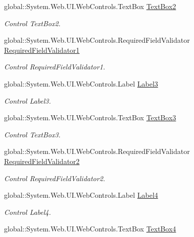 \begin{DoxyCompactItemize}
global\+::\+System.\+Web.\+U\+I.\+Web\+Controls.\+Text\+Box \mbox{\hyperlink{class_inicio_1_1_registro_a24be4248d4791f6b323568f814f5e5c2}{Text\+Box2}}
\begin{DoxyCompactList}\small\item\em Control Text\+Box2. \end{DoxyCompactList}\item 
global\+::\+System.\+Web.\+U\+I.\+Web\+Controls.\+Required\+Field\+Validator \mbox{\hyperlink{class_inicio_1_1_registro_af596d0fdac782957e6f85a4e5d8f3ee3}{Required\+Field\+Validator1}}
\begin{DoxyCompactList}\small\item\em Control Required\+Field\+Validator1. \end{DoxyCompactList}\item 
global\+::\+System.\+Web.\+U\+I.\+Web\+Controls.\+Label \mbox{\hyperlink{class_inicio_1_1_registro_ae363d31acf3834211c8e17996e39782f}{Label3}}
\begin{DoxyCompactList}\small\item\em Control Label3. \end{DoxyCompactList}\item 
global\+::\+System.\+Web.\+U\+I.\+Web\+Controls.\+Text\+Box \mbox{\hyperlink{class_inicio_1_1_registro_adc45c7cdfd1ee0e80f517f1bb9e827ff}{Text\+Box3}}
\begin{DoxyCompactList}\small\item\em Control Text\+Box3. \end{DoxyCompactList}\item 
global\+::\+System.\+Web.\+U\+I.\+Web\+Controls.\+Required\+Field\+Validator \mbox{\hyperlink{class_inicio_1_1_registro_a315fe7dd04ad883d4acd03f25fb7c1e9}{Required\+Field\+Validator2}}
\begin{DoxyCompactList}\small\item\em Control Required\+Field\+Validator2. \end{DoxyCompactList}\item 
global\+::\+System.\+Web.\+U\+I.\+Web\+Controls.\+Label \mbox{\hyperlink{class_inicio_1_1_registro_a0cb8176c99e6ad87d5f77896e1aaf5d1}{Label4}}
\begin{DoxyCompactList}\small\item\em Control Label4. \end{DoxyCompactList}\item 
global\+::\+System.\+Web.\+U\+I.\+Web\+Controls.\+Text\+Box \mbox{\hyperlink{class_inicio_1_1_registro_a835108d17c8690d089f9ee129b2ff7f3}{Text\+Box4}}

\end{DoxyCompactItemize}

